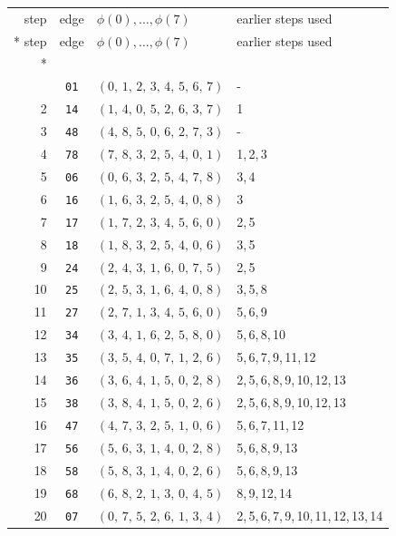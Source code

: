 \begin{longtable}{r c p{} p{}}
\toprule
step & edge & $\phi(0),\ldots,\phi(7)$ & earlier steps used \\*
\midrule
\endfirsthead
\toprule
step & edge & $\phi(0),\ldots,\phi(7)$ & earlier steps used \\*
\midrule
\endhead
\midrule
\multicolumn{4}{r}{\emph{continued on next page}}\\
\endfoot
\bottomrule
\endlastfoot
1 & \texttt{01} & $(0,\,1,\,2,\,3,\,4,\,5,\,6,\,7)$ & - \\
2 & \texttt{14} & $(1,\,4,\,0,\,5,\,2,\,6,\,3,\,7)$ & 1 \\
3 & \texttt{48} & $(4,\,8,\,5,\,0,\,6,\,2,\,7,\,3)$ & - \\
4 & \texttt{78} & $(7,\,8,\,3,\,2,\,5,\,4,\,0,\,1)$ & 1,\,2,\,3 \\
5 & \texttt{06} & $(0,\,6,\,3,\,2,\,5,\,4,\,7,\,8)$ & 3,\,4 \\
6 & \texttt{16} & $(1,\,6,\,3,\,2,\,5,\,4,\,0,\,8)$ & 3 \\
7 & \texttt{17} & $(1,\,7,\,2,\,3,\,4,\,5,\,6,\,0)$ & 2,\,5 \\
8 & \texttt{18} & $(1,\,8,\,3,\,2,\,5,\,4,\,0,\,6)$ & 3,\,5 \\
9 & \texttt{24} & $(2,\,4,\,3,\,1,\,6,\,0,\,7,\,5)$ & 2,\,5 \\
10 & \texttt{25} & $(2,\,5,\,3,\,1,\,6,\,4,\,0,\,8)$ & 3,\,5,\,8 \\
11 & \texttt{27} & $(2,\,7,\,1,\,3,\,4,\,5,\,6,\,0)$ & 5,\,6,\,9 \\
12 & \texttt{34} & $(3,\,4,\,1,\,6,\,2,\,5,\,8,\,0)$ & 5,\,6,\,8,\,10 \\
13 & \texttt{35} & $(3,\,5,\,4,\,0,\,7,\,1,\,2,\,6)$ & 5,\,6,\,7,\,9,\,11,\,12 \\
14 & \texttt{36} & $(3,\,6,\,4,\,1,\,5,\,0,\,2,\,8)$ & 2,\,5,\,6,\,8,\,9,\,10,\,12,\,13 \\
15 & \texttt{38} & $(3,\,8,\,4,\,1,\,5,\,0,\,2,\,6)$ & 2,\,5,\,6,\,8,\,9,\,10,\,12,\,13 \\
16 & \texttt{47} & $(4,\,7,\,3,\,2,\,5,\,1,\,0,\,6)$ & 5,\,6,\,7,\,11,\,12 \\
17 & \texttt{56} & $(5,\,6,\,3,\,1,\,4,\,0,\,2,\,8)$ & 5,\,6,\,8,\,9,\,13 \\
18 & \texttt{58} & $(5,\,8,\,3,\,1,\,4,\,0,\,2,\,6)$ & 5,\,6,\,8,\,9,\,13 \\
19 & \texttt{68} & $(6,\,8,\,2,\,1,\,3,\,0,\,4,\,5)$ & 8,\,9,\,12,\,14 \\
20 & \texttt{07} & $(0,\,7,\,5,\,2,\,6,\,1,\,3,\,4)$ & 2,\,5,\,6,\,7,\,9,\,10,\,11,\,12,\,13,\,14 \\
\end{longtable}
